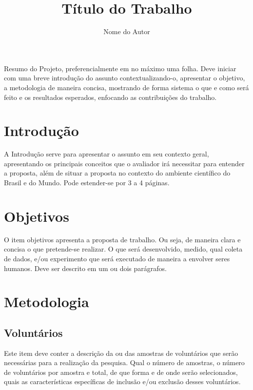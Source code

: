 \documentclass[rascunho,xindy]{Classe-Latex-FEI/fei}
\author{Nome do Autor}
\title{Título do Trabalho}
\begin{document}
\maketitle


\begin{resumo}
Resumo do Projeto, preferencialmente em no máximo uma folha. Deve iniciar com uma breve introdução do assunto contextualizando-o, apresentar o objetivo, a metodologia de maneira concisa, mostrando de forma sistema o que e como será feito e os resultados esperados, enfocando as contribuições do trabalho.
\end{resumo}


\tableofcontents

\chapter{Introdução}

A Introdução serve para apresentar o assunto em seu contexto geral, apresentando os principais conceitos que o avaliador irá necessitar para entender a proposta, além de situar a proposta no contexto do ambiente científico do Brasil e do Mundo. Pode estender-se por 3 a 4 páginas.

\chapter{Objetivos}

O item objetivos apresenta a proposta de trabalho. Ou seja, de maneira clara e concisa o que pretende-se realizar. O que será desenvolvido, medido, qual coleta de dados, e/ou experimento que será executado de maneira a envolver seres humanos. Deve ser descrito em um ou dois parágrafos.

\chapter{Metodologia}

\section{Voluntários}

Este item deve conter a descrição da ou das amostras de voluntários que serão necessárias para a realização da pesquisa. Qual o número de amostras, o número de voluntários por amostra e total, de que forma e de onde serão selecionados, quais as características específicas de inclusão e/ou exclusão desses voluntários.
\end{document}
